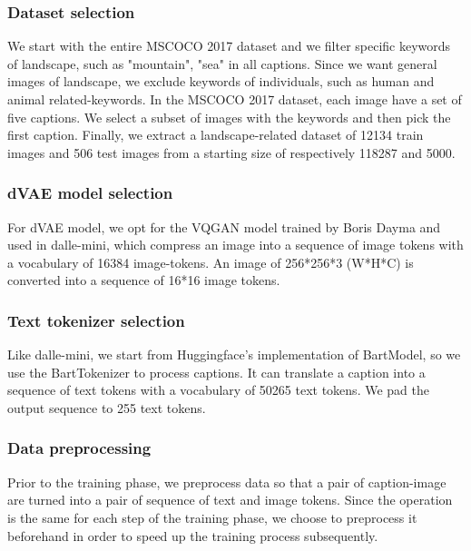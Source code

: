 \documentclass{article}
\begin{document}
\subsubsection{Dataset selection}

We start with the entire MSCOCO 2017 dataset and we filter specific keywords of landscape, such as "mountain", "sea" in all captions. Since we want general images of landscape, we exclude keywords of individuals, such as human and animal related-keywords. In the MSCOCO 2017 dataset, each image have a set of five captions. We select a subset of images with the keywords and then pick the first caption. Finally, we extract a landscape-related dataset of 12134 train images and 506 test images from a starting size of respectively 118287 and 5000.

\subsubsection{dVAE model selection}
For dVAE model, we opt for the VQGAN model trained by Boris Dayma and used in dalle-mini, which compress an image into a sequence of image tokens with a vocabulary of 16384 image-tokens. An image of 256*256*3 (W*H*C) is converted into a sequence of 16*16 image tokens.

\subsubsection{Text tokenizer selection}
Like dalle-mini, we start from Huggingface's implementation of BartModel, so we use the BartTokenizer to process captions. It can translate a caption into a sequence of text tokens with a vocabulary of 50265 text tokens. We pad the output sequence to 255 text tokens.

\subsubsection{Data preprocessing}
Prior to the training phase, we preprocess data so that a pair of caption-image are turned into a pair of sequence of text and image tokens. Since the operation is the same for each step of the training phase, we choose to preprocess it beforehand in order to speed up the training process subsequently.
\end{document}

